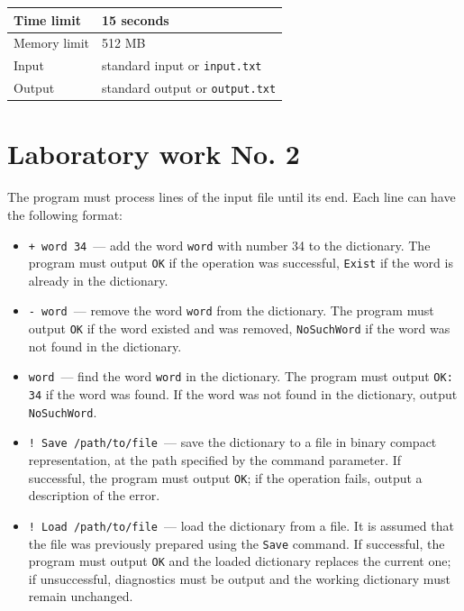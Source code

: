 
\begin{table}[!ht]
\centering
\begin{tabular}{|l|l|}
\hline
Time limit & 15 seconds \\
\hline
Memory limit & 512 MB \\
\hline
Input & standard input or \texttt{input.txt} \\
\hline
Output & standard output or \texttt{output.txt} \\
\hline
\end{tabular}
\end{table}

\section*{Laboratory work No. 2}


The program must process lines of the input file until its end. Each line can have the following
format:

\begin{itemize}
    \item \texttt{+ word 34}~--- add the word \texttt{word} with number 34 to the dictionary. The
    program must output \texttt{OK} if the operation was successful, \texttt{Exist} if the word is
    already in the dictionary.
    \item \texttt{- word}~--- remove the word \texttt{word} from the dictionary. The program must
    output \texttt{OK} if the word existed and was removed, \texttt{NoSuchWord} if the word was not
    found in the dictionary.
    \item \texttt{word}~--- find the word \texttt{word} in the dictionary. The program must output
    \texttt{OK: 34} if the word was found. If the word was not found in the dictionary, output
    \texttt{NoSuchWord}.
    \item \texttt{! Save /path/to/file}~--- save the dictionary to a file in binary compact
    representation, at the path specified by the command parameter. If successful, the program
    must output \texttt{OK}; if the operation fails, output a description of the error.
    \item \texttt{! Load /path/to/file}~--- load the dictionary from a file. It is assumed that the
    file was previously prepared using the \texttt{Save} command. If successful, the program must
    output \texttt{OK} and the loaded dictionary replaces the current one; if unsuccessful,
    diagnostics must be output and the working dictionary must remain unchanged.
\end{itemize}

